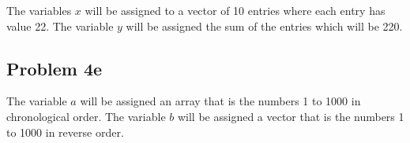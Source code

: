 \documentclass[11pt,psfig]{article}
\begin{document}
The variables $x$ will be assigned to a vector of 10 entries where each entry has value 22. The variable $y$ will be assigned the sum of the entries which will be 220.

\subsection*{Problem 4e}

The variable $a$ will be assigned an array that is the numbers 1 to 1000 in chronological order. The variable $b$ will be assigned a vector that is the numbers 1 to 1000 in reverse order. 

\end{document}
